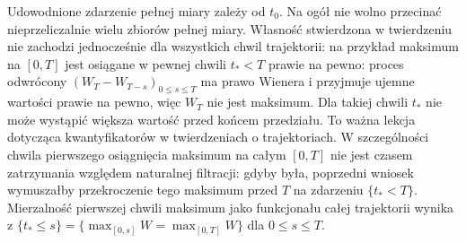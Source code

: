 \begin{uwaga}
Udowodnione zdarzenie pełnej miary zależy od $t_0$.
Na ogół nie wolno przecinać nieprzeliczalnie wielu
zbiorów pełnej miary. Własność stwierdzona w twierdzeniu
nie zachodzi jednocześnie dla wszystkich chwil trajektorii:
na przykład maksimum na $[0,T]$ jest osiągane
w pewnej chwili $t_*<T$ prawie na pewno: proces odwrócony
$(W_T-W_{T-s})_{0\le s\le T}$ ma prawo Wienera
i przyjmuje ujemne wartości prawie na pewno, więc $W_T$
nie jest maksimum. Dla takiej chwili $t_*$ nie może
wystąpić większa wartość przed końcem przedziału. To ważna lekcja dotycząca kwantyfikatorów
w twierdzeniach o trajektoriach.
W szczególności chwila pierwszego osiągnięcia
maksimum na całym $[0,T]$ nie jest czasem zatrzymania
względem naturalnej filtracji: gdyby była, poprzedni
wniosek wymuszałby przekroczenie tego maksimum
przed $T$ na zdarzeniu $\{t_*<T\}$.
Mierzalność pierwszej chwili maksimum jako funkcjonału
całej trajektorii wynika z
$\{t_*\le s\}=\{\max_{[0,s]}W=\max_{[0,T]}W\}$
dla $0\le s\le T$.
\end{uwaga}

